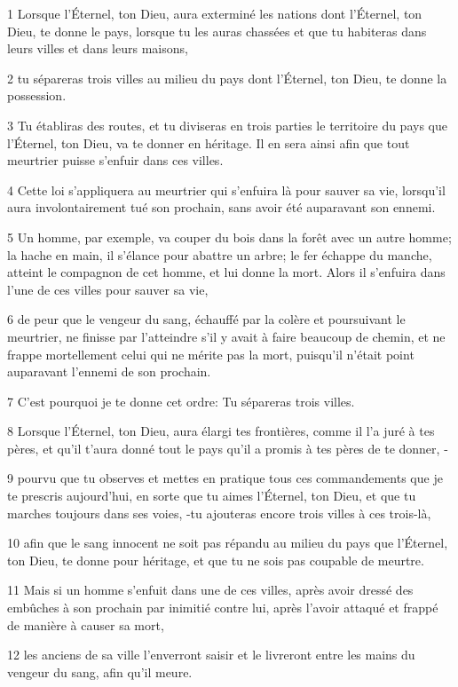 \par 1 Lorsque l'Éternel, ton Dieu, aura exterminé les nations dont l'Éternel, ton Dieu, te donne le pays, lorsque tu les auras chassées et que tu habiteras dans leurs villes et dans leurs maisons,
\par 2 tu sépareras trois villes au milieu du pays dont l'Éternel, ton Dieu, te donne la possession.
\par 3 Tu établiras des routes, et tu diviseras en trois parties le territoire du pays que l'Éternel, ton Dieu, va te donner en héritage. Il en sera ainsi afin que tout meurtrier puisse s'enfuir dans ces villes.
\par 4 Cette loi s'appliquera au meurtrier qui s'enfuira là pour sauver sa vie, lorsqu'il aura involontairement tué son prochain, sans avoir été auparavant son ennemi.
\par 5 Un homme, par exemple, va couper du bois dans la forêt avec un autre homme; la hache en main, il s'élance pour abattre un arbre; le fer échappe du manche, atteint le compagnon de cet homme, et lui donne la mort. Alors il s'enfuira dans l'une de ces villes pour sauver sa vie,
\par 6 de peur que le vengeur du sang, échauffé par la colère et poursuivant le meurtrier, ne finisse par l'atteindre s'il y avait à faire beaucoup de chemin, et ne frappe mortellement celui qui ne mérite pas la mort, puisqu'il n'était point auparavant l'ennemi de son prochain.
\par 7 C'est pourquoi je te donne cet ordre: Tu sépareras trois villes.
\par 8 Lorsque l'Éternel, ton Dieu, aura élargi tes frontières, comme il l'a juré à tes pères, et qu'il t'aura donné tout le pays qu'il a promis à tes pères de te donner, -
\par 9 pourvu que tu observes et mettes en pratique tous ces commandements que je te prescris aujourd'hui, en sorte que tu aimes l'Éternel, ton Dieu, et que tu marches toujours dans ses voies, -tu ajouteras encore trois villes à ces trois-là,
\par 10 afin que le sang innocent ne soit pas répandu au milieu du pays que l'Éternel, ton Dieu, te donne pour héritage, et que tu ne sois pas coupable de meurtre.
\par 11 Mais si un homme s'enfuit dans une de ces villes, après avoir dressé des embûches à son prochain par inimitié contre lui, après l'avoir attaqué et frappé de manière à causer sa mort,
\par 12 les anciens de sa ville l'enverront saisir et le livreront entre les mains du vengeur du sang, afin qu'il meure.
